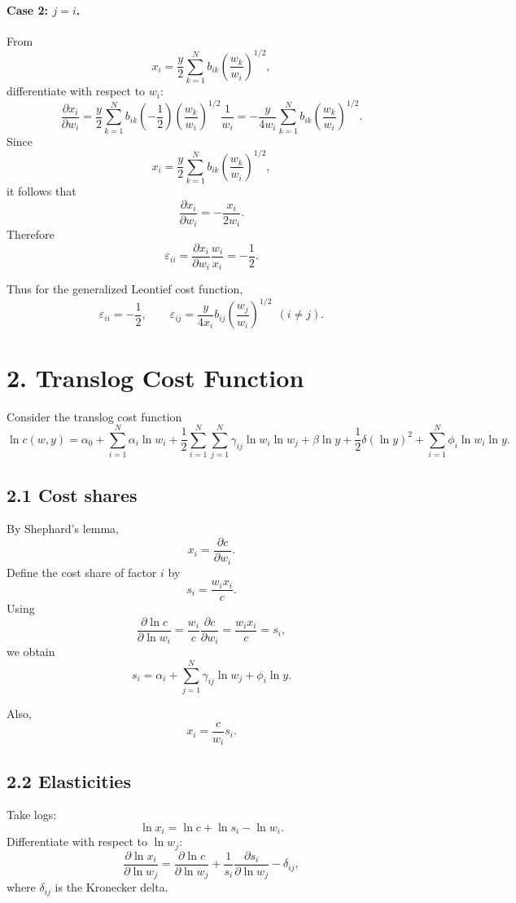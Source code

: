 \paragraph{Case 2: \(j=i\).}
From
\[
x_i
=
\frac{y}{2}\sum_{k=1}^N b_{ik}\left(\frac{w_k}{w_i}\right)^{1/2},
\]
differentiate with respect to \(w_i\):
\[
\frac{\partial x_i}{\partial w_i}
=
\frac{y}{2}\sum_{k=1}^N b_{ik}\left(-\frac{1}{2}\right)\left(\frac{w_k}{w_i}\right)^{1/2}\frac{1}{w_i}
=
-\frac{y}{4w_i}\sum_{k=1}^N b_{ik}\left(\frac{w_k}{w_i}\right)^{1/2}.
\]
Since
\[
x_i=\frac{y}{2}\sum_{k=1}^N b_{ik}\left(\frac{w_k}{w_i}\right)^{1/2},
\]
it follows that
\[
\frac{\partial x_i}{\partial w_i}
=
-\frac{x_i}{2w_i}.
\]
Therefore
\[
\boxed{
\varepsilon_{ii}
=
\frac{\partial x_i}{\partial w_i}\frac{w_i}{x_i}
=
-\frac{1}{2}.
}
\]

Thus for the generalized Leontief cost function,
\[
\boxed{
\varepsilon_{ii}=-\frac{1}{2},
\qquad
\varepsilon_{ij}
=
\frac{y}{4x_i}b_{ij}\left(\frac{w_j}{w_i}\right)^{1/2}
\ \ (i\neq j).
}
\]

\bigskip
\section*{2. Translog Cost Function}

Consider the translog cost function
\[
\ln c(w,y)
=
\alpha_0
+
\sum_{i=1}^N \alpha_i \ln w_i
+
\frac{1}{2}\sum_{i=1}^N\sum_{j=1}^N \gamma_{ij}\ln w_i \ln w_j
+
\beta \ln y
+
\frac{1}{2}\delta (\ln y)^2
+
\sum_{i=1}^N \phi_i \ln w_i \ln y.
\]

\subsection*{2.1 Cost shares}

By Shephard's lemma,
\[
x_i=\frac{\partial c}{\partial w_i}.
\]
Define the cost share of factor \(i\) by
\[
s_i=\frac{w_i x_i}{c}.
\]
Using
\[
\frac{\partial \ln c}{\partial \ln w_i}
=
\frac{w_i}{c}\frac{\partial c}{\partial w_i}
=
\frac{w_i x_i}{c}
=
s_i,
\]
we obtain
\[
\boxed{
s_i
=
\alpha_i+\sum_{j=1}^N \gamma_{ij}\ln w_j+\phi_i \ln y.
}
\]

Also,
\[
x_i=\frac{c}{w_i}s_i.
\]

\subsection*{2.2 Elasticities}

Take logs:
\[
\ln x_i=\ln c+\ln s_i-\ln w_i.
\]
Differentiate with respect to \(\ln w_j\):
\[
\frac{\partial \ln x_i}{\partial \ln w_j}
=
\frac{\partial \ln c}{\partial \ln w_j}
+
\frac{1}{s_i}\frac{\partial s_i}{\partial \ln w_j}
-
\delta_{ij},
\]
where \(\delta_{ij}\) is the Kronecker delta.

